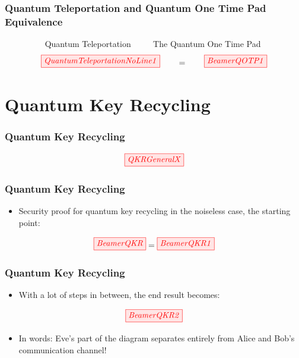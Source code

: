 \documentclass[]{beamer}
\begin{document}
\begin{frame}
	\frametitle{Quantum Teleportation and Quantum One Time Pad Equivalence}
~~~~~~~~~	Quantum Teleportation ~~~~ The Quantum One Time Pad
	\begin{equation}
	\tikzfig{QuantumTeleportationNoLine1} ~~~~~~=~~~~~~ \tikzfig{BeamerQOTP1} %
	\end{equation}
\end{frame}
\begin{frame}
	\centering 
	\Huge
\end{frame}
\section{Quantum Key Recycling}
\begin{frame}
	\frametitle{Quantum Key Recycling}
	\begin{equation}
	\tikzfig{QKRGeneralX}
	\end{equation}
\end{frame}

\begin{frame}
	\frametitle{Quantum Key Recycling}
	\begin{itemize}
		\item Security proof for quantum key recycling in the noiseless case, the starting point:
		\vspace{0.5cm}
	\end{itemize}
	\begin{equation}
		\tikzfig{BeamerQKR} = \tikzfig{BeamerQKR1} 
	\end{equation}
\end{frame}

\begin{frame}
	\frametitle{Quantum Key Recycling}
	\begin{itemize}
		\item With a lot of steps in between, the end result becomes:
		\vspace{0.5cm}
	\end{itemize}
	\begin{equation}
	\tikzfig{BeamerQKR2}
	\end{equation}
		\begin{itemize}
		\item In words: Eve's part of the diagram separates entirely from Alice and Bob's communication channel!
	\end{itemize}
\end{frame}
\begin{frame}
	\centering 
	\Huge
\end{frame}
\end{document}
